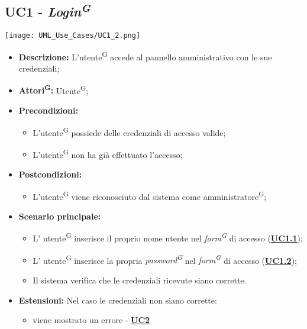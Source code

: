 \subsection{UC1 - \textit{Login\textsuperscript{G}}}
\label{sec:UC1}
\texttt{[image: UML\_Use\_Cases/UC1\_2.png]}
\begin{itemize}
	\item \textbf{Descrizione:} L’utente\textsuperscript{G} accede al pannello amministrativo con le sue credenziali;
	\item \textbf{Attori\textsuperscript{G}:} Utente\textsuperscript{G};
	\item \textbf{Precondizioni:} 
	\begin{itemize}
		\item L’utente\textsuperscript{G} possiede delle credenziali di accesso valide;
		\item L’utente\textsuperscript{G} non ha già effettuato l’accesso;
	\end{itemize}
	\item \textbf{Postcondizioni:} 
	\begin{itemize}
		\item L’utente\textsuperscript{G} viene riconosciuto dal sistema come amministratore\textsuperscript{G};
	\end{itemize}
	\item \textbf{Scenario principale:} 
	\begin{itemize}
		\item L’ utente\textsuperscript{G} inserisce il proprio nome utente nel \textit{form\textsuperscript{G}} di accesso (\hyperref[sec:UC1.1]{\textbf{UC1.1}});
		\item L’ utente\textsuperscript{G} inserisce la propria \textit{password\textsuperscript{G}} nel \textit{form\textsuperscript{G}} di accesso (\hyperref[sec:UC1.2]{\textbf{UC1.2}});
		\item Il sistema verifica che le credenziali ricevute siano corrette. 
	\end{itemize}
	\item \textbf{Estensioni:} Nel caso le credenziali non siano corrette:
	\begin{itemize}
		\item viene mostrato un errore - \hyperref[sec:UC2]{\textbf{UC2}}
	\end{itemize}
\end{itemize}

